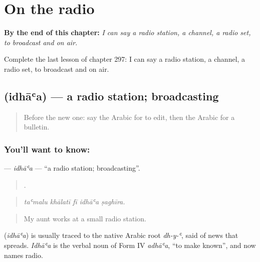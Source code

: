 
\chapter{On the radio}
\label{ch:ar-on-the-radio}

\begin{chapteropening}
\textbf{By the end of this chapter:} \emph{I can say a radio station, a channel, a radio set, to broadcast and on air.}

Complete the last lesson of chapter 297: I can say a radio station, a channel, a radio set, to broadcast and on air.
\end{chapteropening}

\section[\texorpdfstring{\ar{إذاعة} (idhāʿa)}{إذاعة (idhāʿa)}]{ (idhāʿa) — a radio station; broadcasting}

\label{lesson:AR-C297-idhaa}



\begin{quote}
Before the new one: say the Arabic for to edit, then the Arabic for a bulletin.
\end{quote}

\subsection*{You'll want to know: }
\textbf{} — \emph{idhāʿa} — \textquotedblleft{}a radio station; broadcasting\textquotedblright{}.

\begin{quote}
    .
\end{quote}

\begin{quote}
\emph{taʿmalu khālatī fī idhāʿa ṣaghīra.}
\end{quote}

\begin{quote}
My aunt works at a small radio station.
\end{quote}

\begin{cousinweb}
\textbf{} (\emph{idhāʿa}) is usually traced to the native Arabic root \emph{dh-y-ʿ}, said of news that spreads. \emph{Idhāʿa} is the verbal noun of Form IV \emph{adhāʿa}, \textquotedblleft{}to make known\textquotedblright{}, and now names radio.
\end{cousinweb}

